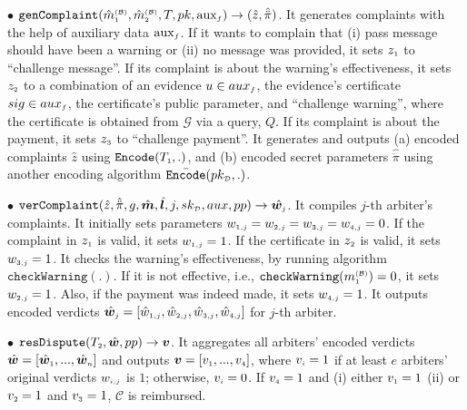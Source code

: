 \begin{definition}
 
 \item  [$\bullet$] $\mathtt{genComplaint}(\hat m^{\scriptscriptstyle\mathcal{(B)}}_{\scriptscriptstyle 1}, \hat m^{\scriptscriptstyle\mathcal{(B)}}_{\scriptscriptstyle2}, T, pk, \text{aux}_{\scriptscriptstyle f})\rightarrow (\hat z, \hat{\ddot \pi})$. It  generates complaints with the help of auxiliary data $\text{aux}_{\scriptscriptstyle f}$.  If it wants to complain that (i)   pass message should have been a warning  or (ii) no  message was provided,   it sets $z_{\scriptscriptstyle 1}$ to ``challenge message''. If its complaint is about the warning's effectiveness,  it sets $z_{\scriptscriptstyle 2}$ to a combination of an evidence $u\in aux_{\scriptscriptstyle f}$, the evidence's certificate $sig\in aux_{\scriptscriptstyle f}$, the certificate's public parameter,   and ``challenge warning'', where the certificate is obtained from  $\mathcal{G}$ via a query, $Q$. If its complaint is  about the   payment, it sets $z_{\scriptscriptstyle 3}$ to ``challenge payment''. It  generates and outputs  (a) encoded complaints $\hat z$ using  $\mathtt{Encode}(T_{\scriptscriptstyle 1},.)$, and (b) encoded secret  parameters $\hat{\ddot \pi}$  using another encoding algorithm $\bar{\mathtt{Encode}}(pk_{\scriptscriptstyle \mathcal{D}},.)$.   
%
\item  [$\bullet$] $\mathtt{verComplaint}( \hat z, \hat{\ddot{\pi}}, g, \hat{\bm m}, \hat{\bm{l}}, j, sk_{\scriptscriptstyle\mathcal D}, aux, pp)\rightarrow \hat{\bm{w}_{\scriptscriptstyle j}}$. It compiles $j$-th arbiter's complaints. It initially sets parameters ${w}_{\scriptscriptstyle 1,j}= {w}_{\scriptscriptstyle 2, j}= {w}_{\scriptscriptstyle 3, j}= {w}_{\scriptscriptstyle 4, j}=0$. If the complaint in $ z_{\scriptscriptstyle 1}$ is valid, it sets  $w_{\scriptscriptstyle 1,j}=1$. If the certificate in $z_{\scriptscriptstyle 2}$ is valid,  it sets $ w_{\scriptscriptstyle 3,j}=1$. It  checks the warning's effectiveness, by running  algorithm $\mathtt{checkWarning}(.)$. If  it is not effective, i.e., $\mathtt{checkWarning}({m}^{\scriptscriptstyle\mathcal{(B)}}_{\scriptscriptstyle1})= 0$,  it sets  $w_{\scriptscriptstyle 2,j}=1$.  Also, if  the payment was indeed made,    it sets $w_{\scriptscriptstyle 4,j}=1$. It outputs encoded verdicts $\hat{\bm{w}}_{\scriptscriptstyle j}= [\hat {w}_{\scriptscriptstyle 1,j}, \hat{w}_{\scriptscriptstyle 2, j}, \hat{w}_{\scriptscriptstyle 3, j}, \hat{w}_{\scriptscriptstyle 4, j}]$ for $j$-th arbiter. %
%
\item  [$\bullet$] $\mathtt{resDispute}(T_{\scriptscriptstyle2}, \hat{\bm{w}}, pp)\rightarrow {\bm v}$. It  aggregates all  arbiters' encoded verdicts $\hat{\bm{w}}=[\hat{\bm{w}}_{\scriptscriptstyle 1},...,\hat{\bm{w}}_{\scriptscriptstyle n}]$ and outputs $\bm{v}=[v_{\scriptscriptstyle 1},..., v_{\scriptscriptstyle 4}]$, where $v_{\scriptscriptstyle i}=1$ if at least $e$ arbiters' original verdicts ${w}_{\scriptscriptstyle i,j}$ is $1$; otherwise, $v_{\scriptscriptstyle i}=0$. If $v_{\scriptscriptstyle 4}=1$ and (i) either $v_{\scriptscriptstyle 1}=1$ (ii) or $v_{\scriptscriptstyle 2}=1$ and $v_{\scriptscriptstyle 3}=1$,   $\mathcal C$  is reimbursed.
%
\end{definition}



